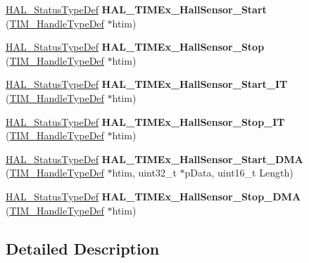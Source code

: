 \begin{DoxyCompactItemize}
\item 
\mbox{\label{group___t_i_m_ex___exported___functions___group1_ga9f4bfa2a4b890a2219ca927bbbb455fc}} 
\hyperlink{stm32f1xx__hal__def_8h_a63c0679d1cb8b8c684fbb0632743478f}{H\+A\+L\+\_\+\+Status\+Type\+Def} {\bfseries H\+A\+L\+\_\+\+T\+I\+M\+Ex\+\_\+\+Hall\+Sensor\+\_\+\+Start} (\hyperlink{struct_t_i_m___handle_type_def}{T\+I\+M\+\_\+\+Handle\+Type\+Def} $\ast$htim)
\item 
\mbox{\label{group___t_i_m_ex___exported___functions___group1_ga714c2a7a51f4ab61b04df84ab182eb86}} 
\hyperlink{stm32f1xx__hal__def_8h_a63c0679d1cb8b8c684fbb0632743478f}{H\+A\+L\+\_\+\+Status\+Type\+Def} {\bfseries H\+A\+L\+\_\+\+T\+I\+M\+Ex\+\_\+\+Hall\+Sensor\+\_\+\+Stop} (\hyperlink{struct_t_i_m___handle_type_def}{T\+I\+M\+\_\+\+Handle\+Type\+Def} $\ast$htim)
\item 
\mbox{\label{group___t_i_m_ex___exported___functions___group1_gaf3e7068c5bc6fc74e016cc8e990cbb02}} 
\hyperlink{stm32f1xx__hal__def_8h_a63c0679d1cb8b8c684fbb0632743478f}{H\+A\+L\+\_\+\+Status\+Type\+Def} {\bfseries H\+A\+L\+\_\+\+T\+I\+M\+Ex\+\_\+\+Hall\+Sensor\+\_\+\+Start\+\_\+\+IT} (\hyperlink{struct_t_i_m___handle_type_def}{T\+I\+M\+\_\+\+Handle\+Type\+Def} $\ast$htim)
\item 
\mbox{\label{group___t_i_m_ex___exported___functions___group1_gac6ab7ab0cada425a8d4deb637bd2ad71}} 
\hyperlink{stm32f1xx__hal__def_8h_a63c0679d1cb8b8c684fbb0632743478f}{H\+A\+L\+\_\+\+Status\+Type\+Def} {\bfseries H\+A\+L\+\_\+\+T\+I\+M\+Ex\+\_\+\+Hall\+Sensor\+\_\+\+Stop\+\_\+\+IT} (\hyperlink{struct_t_i_m___handle_type_def}{T\+I\+M\+\_\+\+Handle\+Type\+Def} $\ast$htim)
\item 
\mbox{\label{group___t_i_m_ex___exported___functions___group1_ga3d0d063498f6888d61411d56380f5211}} 
\hyperlink{stm32f1xx__hal__def_8h_a63c0679d1cb8b8c684fbb0632743478f}{H\+A\+L\+\_\+\+Status\+Type\+Def} {\bfseries H\+A\+L\+\_\+\+T\+I\+M\+Ex\+\_\+\+Hall\+Sensor\+\_\+\+Start\+\_\+\+D\+MA} (\hyperlink{struct_t_i_m___handle_type_def}{T\+I\+M\+\_\+\+Handle\+Type\+Def} $\ast$htim, uint32\+\_\+t $\ast$p\+Data, uint16\+\_\+t Length)
\item 
\mbox{\label{group___t_i_m_ex___exported___functions___group1_gab361d1aa6e0eb244886b93908beded6f}} 
\hyperlink{stm32f1xx__hal__def_8h_a63c0679d1cb8b8c684fbb0632743478f}{H\+A\+L\+\_\+\+Status\+Type\+Def} {\bfseries H\+A\+L\+\_\+\+T\+I\+M\+Ex\+\_\+\+Hall\+Sensor\+\_\+\+Stop\+\_\+\+D\+MA} (\hyperlink{struct_t_i_m___handle_type_def}{T\+I\+M\+\_\+\+Handle\+Type\+Def} $\ast$htim)
\end{DoxyCompactItemize}


\subsection{Detailed Description}
